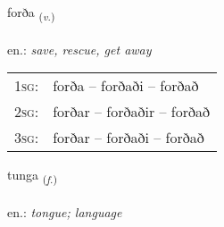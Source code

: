 \documentclass[frontgrid, backgrid]{flacards}\usepackage[]{graphicx}\usepackage[]{xcolor}
\begin{document}
{forða \small{\textsubscript{(\textit{v.})}} \\[1ex] %
\textphonetic{[fɔrða]} \\
en.: \emph{save, rescue, get away} \\  [2ex]
\renewcommand*{\arraystretch}{0.8}
\begin{tabular}{p{1cm}l}
\textsc{1sg}: & forða -- forðaði -- forðað \\ 
\textsc{2sg}: & forðar -- forðaðir -- forðað \\ 
\textsc{3sg}: & forðar -- forðaði -- forðað \\ 
\end{tabular}
}

\renewcommand{\flhead}{\vskip5pt \fboxsep=0pt {\small\bfseries\footnotesize Nafnorð | Noun}}
\renewcommand{\fcfoot}{\vskip5pt \fboxsep=0pt \hspace{2pt}{\small\bfseries\footnotesize 2K}}

\renewcommand{\blhead}{\vskip5pt {\small\bfseries\footnotesize Nafnorð | Noun }}
\renewcommand{\bcfoot}{\vskip5pt \hspace{2pt}{\small\bfseries\footnotesize 2K}}


{tunga \small{\textsubscript{(\textit{f.})}} \\[1ex] %
\textphonetic{[tʰuŋka]} \\
en.: \emph{tongue; language} \\  [2ex]
\renewcommand*{\arraystretch}{0.8}
}

\renewcommand{\flhead}{\vskip5pt \fboxsep=0pt {\small\bfseries\footnotesize Nafnorð | Noun}}
\renewcommand{\fcfoot}{\vskip5pt \fboxsep=0pt \hspace{2pt}{\small\bfseries\footnotesize 2K}}
\end{document}

